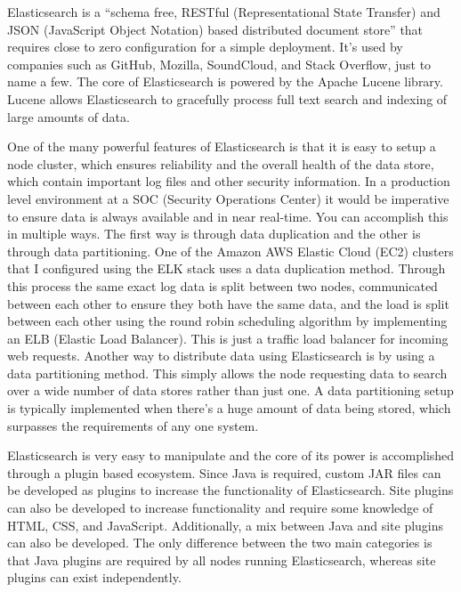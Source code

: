 \documentclass[./main.tex]{subfiles}
\begin{document}
Elasticsearch is a “schema free, RESTful (Representational State Transfer) and JSON (JavaScript Object Notation) based distributed document store” that requires close to zero configuration for a simple deployment. It’s used by companies such as GitHub, Mozilla, SoundCloud, and Stack Overflow, just to name a few. The core of Elasticsearch is powered by the Apache Lucene library. Lucene allows Elasticsearch to gracefully process full text search and indexing of large amounts of data.

One of the many powerful features of Elasticsearch is that it is easy to setup a node cluster, which ensures reliability and the overall health of the data store, which contain important log files and other security information. In a production level environment at a SOC (Security Operations Center) it would be imperative to ensure data is always available and in near real-time. You can accomplish this in multiple ways. The first way is through data duplication and the other is through data partitioning. One of the Amazon AWS Elastic Cloud (EC2) clusters that I configured using the ELK stack uses a data duplication method. Through this process the same exact log data is split between two nodes, communicated between each other to ensure they both have the same data, and the load is split between each other using the round robin scheduling algorithm by implementing an ELB (Elastic Load Balancer). This is just a traffic load balancer for incoming web requests. Another way to distribute data using Elasticsearch is by using a data partitioning method. This simply allows the node requesting data to search over a wide number of data stores rather than just one. A data partitioning setup is typically implemented when there’s a huge amount of data being stored, which surpasses the requirements of any one system.

Elasticsearch is very easy to manipulate and the core of its power is accomplished through a plugin based ecosystem. Since Java is required, custom JAR files can be developed as plugins to increase the functionality of Elasticsearch. Site plugins can also be developed to increase functionality and require some knowledge of HTML, CSS, and JavaScript. Additionally, a mix between Java and site plugins can also be developed. The only difference between the two main categories is that Java plugins are required by all nodes running Elasticsearch, whereas site plugins can exist independently.
\end{document}
